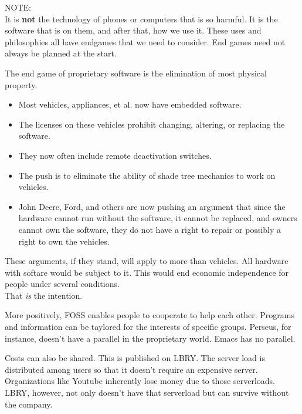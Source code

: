 \documentclass{beamer}
\begin{document}
\begin{frame}
  NOTE:\\
  It is \textbf{not} the technology of phones or computers that is so harmful.
  It is the software that is on them, and after that, how we use it.
  These uses and philosophies all have endgames that we need to consider.
  End games need not always be planned at the start.
\end{frame}

\begin{frame}
  The end game of proprietary software is the elimination of most physical property.\pause
  \begin{itemize}
	\item Most vehicles, appliances, et al. now have embedded software.\pause
	\item The licenses on these vehicles prohibit changing, altering, or replacing the software.\pause
	\item They now often include remote deactivation switches.\pause
	\item The push is to eliminate the ability of shade tree mechanics to work on vehicles.\pause
	\item John Deere, Ford, and others are now pushing an argument that since the hardware cannot run without the software, it cannot be replaced, and owners cannot own the software, they do not have a right to repair or possibly a right to own the vehicles.
  \end{itemize}
\end{frame}

\begin{frame}
  These arguments, if they stand, will apply to more than vehicles.
  All hardware with softare would be subject to it.
  This would end economic independence for people under several conditions.\\ \pause
  That \emph{is} the intention.
\end{frame}

\begin{frame}
  More positively, FOSS enables people to cooperate to help each other.
  Programs and information can be taylored for the interests of specific groups.
  Perseus, for instance, doesn't have a parallel in the proprietary world.
  Emacs has no parallel.
\end{frame}

\begin{frame}
  Costs can also be shared.
  This is published on LBRY.
  The server load is distributed among users so that it doesn't require an expensive server.
  Organizations like Youtube inherently lose money due to those serverloads.
  LBRY, however, not only doesn't have that serverload but can survive without the company.
\end{frame}
\end{document}
